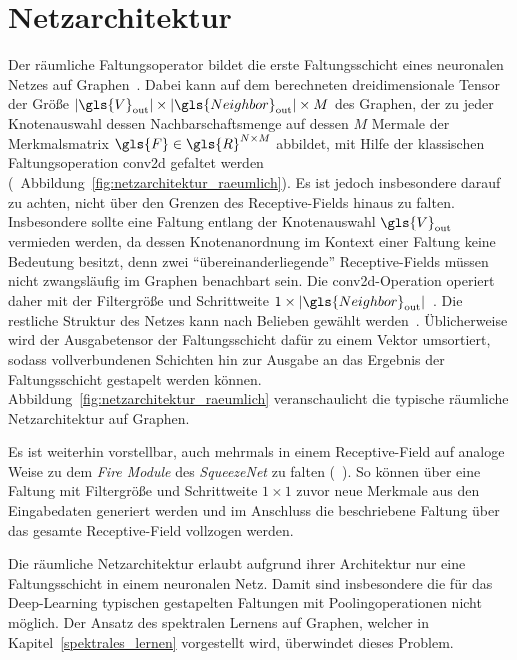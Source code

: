 \section{Netzarchitektur}
\label{raeumliche_netzarchitektur}

Der räumliche Faltungsoperator bildet die erste Faltungsschicht eines neuronalen Netzes auf Graphen~\cite{patchy}.
Dabei kann auf dem berechneten dreidimensionale Tensor der Größe $\left|\gls{V}_{\mathrm{out}}\right| \times \left|\gls{Neighbor}_{\mathrm{out}}\right| \times M$ des Graphen, der zu jeder Knotenauswahl dessen Nachbarschaftsmenge auf dessen $M$ Mermale der Merkmalsmatrix $\gls{F} \in \gls{R}^{N \times M}$ abbildet, mit Hilfe der klassischen Faltungsoperation \gls{conv2d} gefaltet werden (\vgl{}~Abbildung~\ref{fig:netzarchitektur_raeumlich}).
Es ist jedoch insbesondere darauf zu achten, nicht über den Grenzen des Receptive-Fields hinaus zu falten.
Insbesondere sollte eine Faltung entlang der Knotenauswahl $\gls{V}_{\mathrm{out}}$ vermieden werden, da dessen Knotenanordnung im Kontext einer Faltung keine Bedeutung besitzt, denn zwei \enquote{übereinanderliegende} Receptive-Fields müssen nicht zwangsläufig im Graphen benachbart sein.
Die \gls{conv2d}-Operation operiert daher mit der Filtergröße und Schrittweite $1 \times \left|\gls{Neighbor}_{\mathrm{out}}\right|$~\cite{patchy}.
Die restliche Struktur des Netzes kann nach Belieben gewählt werden~\cite{patchy}.
Üblicherweise wird der Ausgabetensor der Faltungsschicht dafür zu einem Vektor umsortiert, sodass vollverbundenen Schichten hin zur Ausgabe an das Ergebnis der Faltungsschicht gestapelt werden können.
Abbildung~\ref{fig:netzarchitektur_raeumlich} veranschaulicht die typische räumliche Netzarchitektur auf Graphen.


Es ist weiterhin vorstellbar, auch mehrmals in einem Receptive-Field auf analoge Weise zu dem \emph{Fire Module} des \emph{SqueezeNet} zu falten (\vgl{}~\cite{squeeze}).
So können \zB{} über eine Faltung mit Filtergröße und Schrittweite $1 \times 1$ zuvor neue Merkmale aus den Eingabedaten generiert werden und im Anschluss die beschriebene Faltung über das gesamte Receptive-Field vollzogen werden.

Die räumliche Netzarchitektur erlaubt aufgrund ihrer Architektur nur eine Faltungsschicht in einem neuronalen Netz.
Damit sind insbesondere die für das Deep-Learning typischen gestapelten Faltungen mit Poolingoperationen nicht möglich.
Der Ansatz des spektralen Lernens auf Graphen, welcher in Kapitel~\ref{spektrales_lernen} vorgestellt wird, überwindet dieses Problem.
